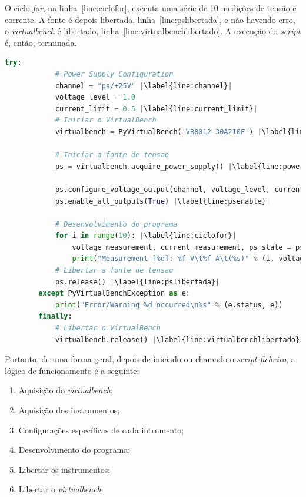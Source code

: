 O ciclo \textit{for}, na linha~\ref{line:ciclofor}, executa uma série de 10 medições de tensão e corrente. A fonte é depois libertada, linha~\ref{line:pslibertada}, e não havendo erro, o \textit{virtualbench} é libertado, linha~\ref{line:virtualbenchlibertado}. A execução do \textit{script} é, então, terminada.

\begin{minipage}{0.9\linewidth}
	\begin{lstlisting}[language=Python,escapechar=|, caption=Exemplo \textit{ps\_example.py}, label=lst:exemplops]
		try:
			# Power Supply Configuration
			channel = "ps/+25V" |\label{line:channel}| 
			voltage_level = 1.0
			current_limit = 0.5 |\label{line:current_limit}| 
			# Iniciar o VirtualBench
			virtualbench = PyVirtualBench('VB8012-30A210F') |\label{line:virtualbench}| 
			
			# Iniciar a fonte de tensao
			ps = virtualbench.acquire_power_supply() |\label{line:powersource}| 

			ps.configure_voltage_output(channel, voltage_level, current_limit) |\label{line:psconfig}|
			ps.enable_all_outputs(True) |\label{line:psenable}|

			# Desenvolvimento do programa
			for i in range(10): |\label{line:ciclofor}|
				voltage_measurement, current_measurement, ps_state = ps.read_output(channel)
				print("Measurement [%d]: %f V\t%f A\t(%s)" % (i, voltage_measurement, current_measurement, str(ps_state)))
			# Libertar a fonte de tensao
			ps.release() |\label{line:pslibertada}|
		except PyVirtualBenchException as e:
    		print("Error/Warning %d occurred\n%s" % (e.status, e))
		finally:
			# Libertar o VirtualBench
    		virtualbench.release() |\label{line:virtualbenchlibertado}|

	\end{lstlisting}
\end{minipage}

Portanto, de uma forma  geral, depois de iniciado ou chamado o \textit{script-ficheiro}, a lógica de funcionamento é a seguinte:
\begin{enumerate}
	\label{item:logica}
	\item Aquisição do \textit{virtualbench};
	\item Aquisição dos instrumentos;
	\item Configurações específicas de cada intrumento;
	\item Desenvolvimento do programa;
	\item Libertar os instrumentos;
	\item Libertar o \textit{virtualbench}.
\end{enumerate}

